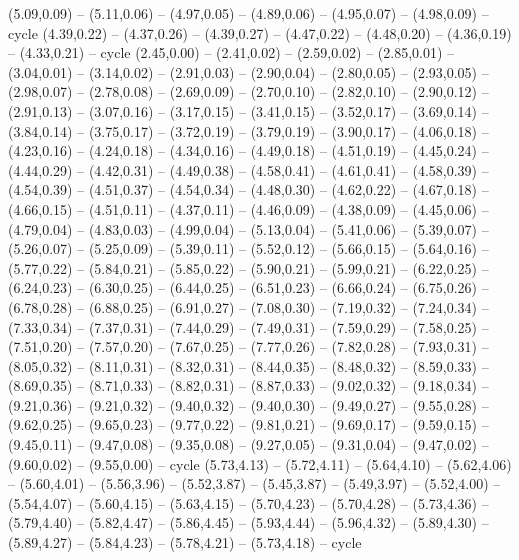 \expandafter\def\csname geo:gebiet:ATA\endcsname{
  (5.09,0.09) -- (5.11,0.06) -- (4.97,0.05) -- (4.89,0.06) -- (4.95,0.07) -- (4.98,0.09) -- cycle
  (4.39,0.22) -- (4.37,0.26) -- (4.39,0.27) -- (4.47,0.22) -- (4.48,0.20) -- (4.36,0.19) -- (4.33,0.21) -- cycle
  (2.45,0.00) -- (2.41,0.02) -- (2.59,0.02) -- (2.85,0.01) -- (3.04,0.01) -- (3.14,0.02) -- (2.91,0.03) -- (2.90,0.04) -- (2.80,0.05) -- (2.93,0.05) -- (2.98,0.07) -- (2.78,0.08) -- (2.69,0.09) -- (2.70,0.10) -- (2.82,0.10) -- (2.90,0.12) -- (2.91,0.13) -- (3.07,0.16) -- (3.17,0.15) -- (3.41,0.15) -- (3.52,0.17) -- (3.69,0.14) -- (3.84,0.14) -- (3.75,0.17) -- (3.72,0.19) -- (3.79,0.19) -- (3.90,0.17) -- (4.06,0.18) -- (4.23,0.16) -- (4.24,0.18) -- (4.34,0.16) -- (4.49,0.18) -- (4.51,0.19) -- (4.45,0.24) -- (4.44,0.29) -- (4.42,0.31) -- (4.49,0.38) -- (4.58,0.41) -- (4.61,0.41) -- (4.58,0.39) -- (4.54,0.39) -- (4.51,0.37) -- (4.54,0.34) -- (4.48,0.30) -- (4.62,0.22) -- (4.67,0.18) -- (4.66,0.15) -- (4.51,0.11) -- (4.37,0.11) -- (4.46,0.09) -- (4.38,0.09) -- (4.45,0.06) -- (4.79,0.04) -- (4.83,0.03) -- (4.99,0.04) -- (5.13,0.04) -- (5.41,0.06) -- (5.39,0.07) -- (5.26,0.07) -- (5.25,0.09) -- (5.39,0.11) -- (5.52,0.12) -- (5.66,0.15) -- (5.64,0.16) -- (5.77,0.22) -- (5.84,0.21) -- (5.85,0.22) -- (5.90,0.21) -- (5.99,0.21) -- (6.22,0.25) -- (6.24,0.23) -- (6.30,0.25) -- (6.44,0.25) -- (6.51,0.23) -- (6.66,0.24) -- (6.75,0.26) -- (6.78,0.28) -- (6.88,0.25) -- (6.91,0.27) -- (7.08,0.30) -- (7.19,0.32) -- (7.24,0.34) -- (7.33,0.34) -- (7.37,0.31) -- (7.44,0.29) -- (7.49,0.31) -- (7.59,0.29) -- (7.58,0.25) -- (7.51,0.20) -- (7.57,0.20) -- (7.67,0.25) -- (7.77,0.26) -- (7.82,0.28) -- (7.93,0.31) -- (8.05,0.32) -- (8.11,0.31) -- (8.32,0.31) -- (8.44,0.35) -- (8.48,0.32) -- (8.59,0.33) -- (8.69,0.35) -- (8.71,0.33) -- (8.82,0.31) -- (8.87,0.33) -- (9.02,0.32) -- (9.18,0.34) -- (9.21,0.36) -- (9.21,0.32) -- (9.40,0.32) -- (9.40,0.30) -- (9.49,0.27) -- (9.55,0.28) -- (9.62,0.25) -- (9.65,0.23) -- (9.77,0.22) -- (9.81,0.21) -- (9.69,0.17) -- (9.59,0.15) -- (9.45,0.11) -- (9.47,0.08) -- (9.35,0.08) -- (9.27,0.05) -- (9.31,0.04) -- (9.47,0.02) -- (9.60,0.02) -- (9.55,0.00) -- cycle}
\expandafter\def\csname geo:gebiet:CYN\endcsname{
  }
\expandafter\def\csname geo:gebiet:CYP\endcsname{
  }
\expandafter\def\csname geo:gebiet:MAR\endcsname{
  (5.73,4.13) -- (5.72,4.11) -- (5.64,4.10) -- (5.62,4.06) -- (5.60,4.01) -- (5.56,3.96) -- (5.52,3.87) -- (5.45,3.87) -- (5.49,3.97) -- (5.52,4.00) -- (5.54,4.07) -- (5.60,4.15) -- (5.63,4.15) -- (5.70,4.23) -- (5.70,4.28) -- (5.73,4.36) -- (5.79,4.40) -- (5.82,4.47) -- (5.86,4.45) -- (5.93,4.44) -- (5.96,4.32) -- (5.89,4.30) -- (5.89,4.27) -- (5.84,4.23) -- (5.78,4.21) -- (5.73,4.18) -- cycle}
